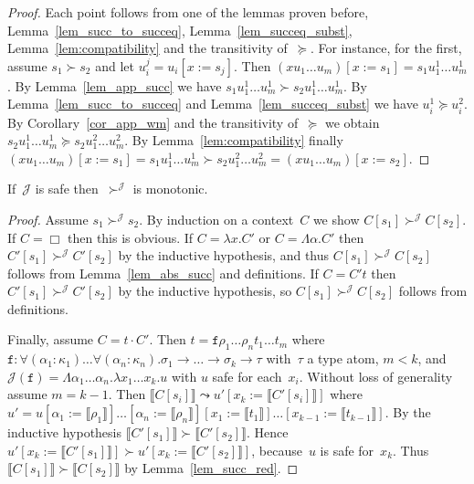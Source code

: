 \documentclass[a4paper,UKenglish,cleveref,autoref,numberwithinsect]{lipics-v2019}
\theoremstyle{definition}
\newcommand{\arrtype}{\rightarrow}
\newcommand{\app}[2]{#1 \cdot #2}
\newcommand{\subst}[2]{#1:=#2}
\newcommand{\abs}[2]{\lambda #1.#2}
\newcommand{\tabs}[2]{\Lambda #1.#2}
\newcommand{\typeinterpret}[1]{\llbracket #1 \rrbracket}
\newcommand{\interpret}[1]{\llbracket #1 \rrbracket}
\newcommand{\Termmap}{\mathcal{J}}
\newcommand{\succinterpret}{\succ^{\Termmap}}
\begin{document}
\begin{proof}
  Each point follows from one of the lemmas proven before,
  Lemma~\ref{lem_succ_to_succeq}, Lemma~\ref{lem_succeq_subst},
  Lemma~\ref{lem:compatibility} and the transitivity of~$\succeq$. For
  instance, for the first, assume $s_1 \succ s_2$ and let
  $u_i^j=u_i[\subst{x}{s_j}]$. Then $(x u_1 \ldots
  u_m)[\subst{x}{s_1}] = s_1 u_1^1 \ldots u_m^1$. By
  Lemma~\ref{lem_app_succ} we have $s_1 u_1^1 \ldots u_m^1 \succ s_2
  u_1^1 \ldots u_m^1$. By Lemma~\ref{lem_succ_to_succeq} and
  Lemma~\ref{lem_succeq_subst} we have $u_i^1 \succeq u_i^2$. By
  Corollary~\ref{cor_app_wm} and the transitivity of~$\succeq$ we
  obtain $s_2 u_1^1 \ldots u_m^1 \succeq s_2 u_1^2 \ldots u_m^2$. By
  Lemma~\ref{lem:compatibility} finally $(x u_1 \ldots
  u_m)[\subst{x}{s_1}] = s_1 u_1^1 \ldots u_m^1 \succ s_2 u_1^2 \ldots
  u_m^2 = (x u_1 \ldots u_m)[\subst{x}{s_2}]$.
\end{proof}

\begin{lemma}\label{lem_succinterpret_monotonic}
  If~$\Termmap$ is safe then~$\succinterpret$ is monotonic.
\end{lemma}

\begin{proof}
  Assume $s_1 \succinterpret s_2$. By induction on
  a context~$C$ we show $C[s_1] \succinterpret C[s_2]$. If $C=\Box$ then
  this is obvious. If $C = \abs{x}{C'}$ or $C = \tabs{\alpha}{C'}$
  then $C'[s_1] \succinterpret C'[s_2]$ by the inductive hypothesis,
  and thus $C[s_1] \succinterpret C[s_2]$ follows from
  Lemma~\ref{lem_abs_succ} and definitions. If $C = C' t$ then
  $C'[s_1] \succinterpret C'[s_2]$ by the inductive hypothesis,
  so $C[s_1] \succinterpret C[s_2]$ follows from definitions.

  Finally, assume $C = \app{t}{C'}$. Then $t = \mathtt{f} \rho_1
  \ldots \rho_n t_1 \ldots t_m$ where
  $
  \mathtt{f} : \forall (\alpha_1 : \kappa_1) \ldots \forall (\alpha_n
  : \kappa_n) . \sigma_1 \arrtype \ldots \arrtype \sigma_k \arrtype
  \tau
  $
  with~$\tau$ a type atom, $m < k$, and $\Termmap(\mathtt{f}) =
  \tabs{\alpha_1 \dots \alpha_n}{\abs{x_1 \dots x_k}{u}}$ with $u$
  safe for each~$x_i$. Without loss of generality assume $m=k-1$. Then
  $\interpret{C[s_i]} \leadsto u'[\subst{x_k}{\interpret{C'[s_i]}}]$
  where
  $u'=u[\subst{\alpha_1}{\typeinterpret{\rho_1}}]\ldots[\subst{\alpha_n}{\typeinterpret{\rho_n}}][\subst{x_1}{\interpret{t_1}}]\ldots[\subst{x_{k-1}}{\interpret{t_{k-1}}}]$. By
  the inductive hypothesis $\interpret{C'[s_1]} \succ
  \interpret{C'[s_2]}$. Hence $u'[\subst{x_k}{\interpret{C'[s_1]}}]
  \succ u'[\subst{x_k}{\interpret{C'[s_2]}}]$, because~$u$ is safe
  for~$x_k$. Thus $\interpret{C[s_1]} \succ \interpret{C[s_2]}$ by
  Lemma~\ref{lem_succ_red}.
\end{proof}
\end{document}
